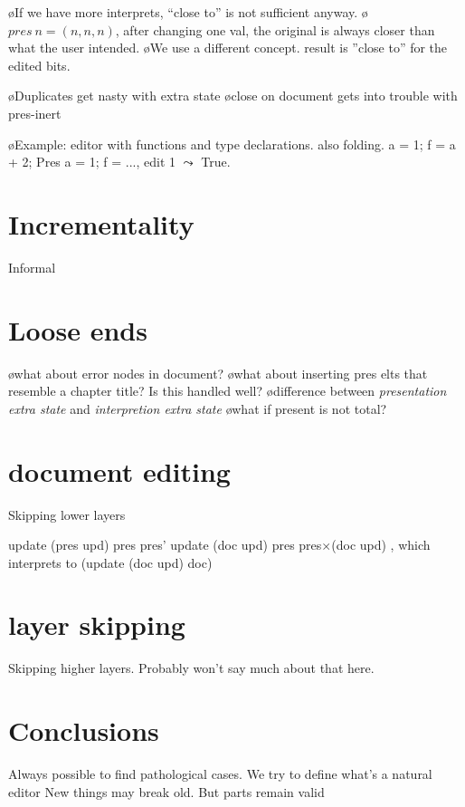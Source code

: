 \bl
\o If we have more interprets, ``close to'' is not sufficient anyway.
\o $pres~n = (n,n,n)$, after changing one val, the original is always closer than what the user intended.
\o We use a different concept. result is ''close to'' for the edited bits.
\el

\bl
\o Duplicates get nasty with extra state
\o close on document gets into trouble with pres-inert
\el

\bl
\o Example: editor with functions and type declarations. also folding. a = 1; f = a + 2; Pres a = 1; f = ..., edit 1 $\leadsto$ True. 
\el


%																
%																
%																
\section{Incrementality}
Informal


%																
%																
%																
\section{Loose ends}
\bl
\o what about error nodes in document?
\o what about inserting pres elts that resemble a chapter title? Is this handled well?
\o difference between {\em presentation extra state} and {\em interpretion extra state}
\o what if present is not total?
\el


%																
%																
%																
\section{document editing}
Skipping lower layers

update (pres upd) pres \rarr pres'
update (doc upd) pres \rarr pres$\times$(doc upd) , which interprets to (update (doc upd) doc)


%																
%																
%																
\section{layer skipping}
Skipping higher layers. Probably won't say much about that here.

\section{Conclusions}

Always possible to find pathological cases.
We try to define what's a natural editor
New things may break old. But parts remain valid

